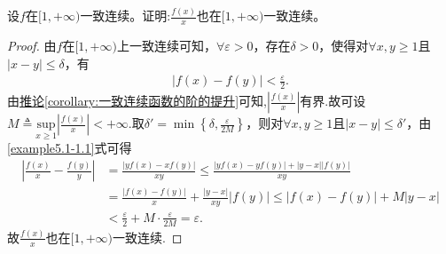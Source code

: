 \documentclass[../../main.tex]{subfiles}%
\begin{document}
\begin{example}
设\(f\)在\([1,+\infty)\)一致连续。证明:\(\frac{f(x)}{x}\)也在\([1,+\infty)\)一致连续。
\end{example}
\begin{proof}

由\(f\)在\([1, +\infty)\)上一致连续可知，\(\forall \varepsilon > 0\)，存在\(\delta > 0\)，使得对\(\forall x, y \geqslant 1\)且\(\vert x - y \vert \leqslant \delta\)，有
\begin{align}\label{example5.1-1.1}
\vert f(x) - f(y) \vert < \frac{\varepsilon}{2}. 
\end{align}
由\hyperref[corollary:一致连续函数的阶的提升]{推论\ref{corollary:一致连续函数的阶的提升}}可知,$\left| \frac{f\left( x \right)}{x} \right|$有界.故可设$M\triangleq \underset{x\geqslant 1}{\mathrm{sup}}\left| \frac{f\left( x \right)}{x} \right|<+\infty$.取\(\delta' = \min \left\{ \delta, \frac{\varepsilon}{2M} \right\}\)，则对\(\forall x, y \geqslant 1\)且\(\vert x - y \vert \leqslant \delta'\)，由\eqref{example5.1-1.1}式可得
\begin{align*}
\left| \frac{f\left( x \right)}{x}-\frac{f\left( y \right)}{y} \right|&=\frac{\left| yf\left( x \right) -xf\left( y \right) \right|}{xy}\leqslant \frac{\left| yf\left( x \right) -yf\left( y \right) \right|+\left| y-x \right|\left| f\left( y \right) \right|}{xy}
\\
&=\frac{\left| f\left( x \right) -f\left( y \right) \right|}{x}+\frac{\left| y-x \right|}{xy}\left| f\left( y \right) \right|\leqslant \left| f\left( x \right) -f\left( y \right) \right|+M\left| y-x \right|
\\
&<\frac{\varepsilon}{2}+M\cdot \frac{\varepsilon}{2M}=\varepsilon .
\end{align*}
故\(\frac{f(x)}{x}\)也在\([1,+\infty)\)一致连续.

\end{proof}
\end{document}
